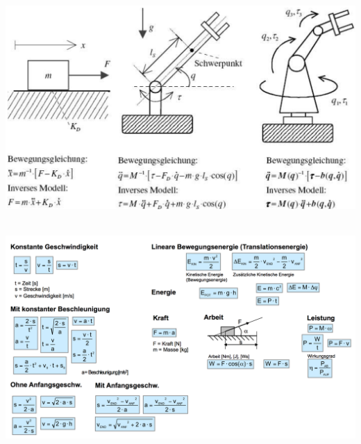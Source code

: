 \begin{minipage}{0.7\linewidth}
    \includegraphics[width=\linewidth]{./bilder/DynMod.png}
\end{minipage}\\
\includegraphics[width=17cm]{./bilder/kinematik.png}


